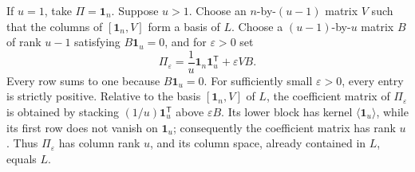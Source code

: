 If \(u=1\), take \(\Pi=\mathbf1_n\). Suppose \(u>1\). Choose an \(n\)-by-\((u-1)\) matrix \(V\) such that the columns of \([\mathbf1_n,V]\) form a basis of \(L\). Choose a \((u-1)\)-by-\(u\) matrix \(B\) of rank \(u-1\) satisfying \(B\mathbf1_u=0\), and for \(\varepsilon>0\) set
\[
\Pi_\varepsilon=\frac1u\mathbf1_n\mathbf1_u^{\mathsf T}+\varepsilon VB.
\]
Every row sums to one because \(B\mathbf1_u=0\). For sufficiently small \(\varepsilon>0\), every entry is strictly positive. Relative to the basis \([\mathbf1_n,V]\) of \(L\), the coefficient matrix of \(\Pi_\varepsilon\) is obtained by stacking \((1/u)\mathbf1_u^{\mathsf T}\) above \(\varepsilon B\). Its lower block has kernel \(\langle\mathbf1_u\rangle\), while its first row does not vanish on \(\mathbf1_u\); consequently the coefficient matrix has rank \(u\). Thus \(\Pi_\varepsilon\) has column rank \(u\), and its column space, already contained in \(L\), equals \(L\).